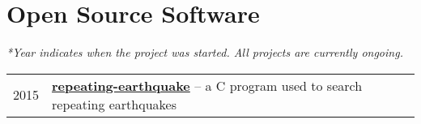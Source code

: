 \section*{Open Source Software}

\textit{*Year indicates when the project was started. All projects are currently ongoing.}

\begin{tabular}{p{} p{}}
2015 &	\textbf{\href{https://github.com/core-man/repeating-earthquake/}{repeating-earthquake}} -- a C program used to search repeating earthquakes \\
\end{tabular}
